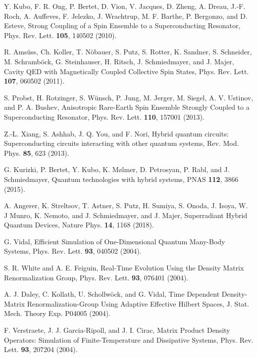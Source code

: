 \documentclass[pra,twocolumn,showpacs,preprintnumbers,amsmath,amssymb,superscriptaddress]{revtex4-1}
\begin{document}
\begin{thebibliography}{99}
 Y. Kubo, F. R. Ong, P. Bertet, D. Vion, V. Jacques, D. Zheng,  A. Dreau, J.-­F. Roch,  A. Auffeves, F. Jelezko, J. Wrachtrup, M. F. Barthe, P. Bergonzo,    and D. Esteve,  Strong Coupling of a Spin Ensemble to a Superconducting Resonator, Phys. Rev. Lett. {\bf 105}, 140502 (2010).


 R. Ams\"uss,    Ch. Koller, T.    N\"obauer,    S. Putz,    S. Rotter,    K. Sandner,    S. Schneider,    M. Schramb\"ock,    G. Steinhauser,    H.    Ritsch,    J. Schmiedmayer, and J. Majer,    Cavity    QED    with    Magnetically    Coupled    Collective    Spin    States,    Phys.    Rev.    Lett.    {\bf 107}, 060502 (2011).

 S. Probst, H. Rotzinger, S. W\"unsch, P. Jung, M. Jerger, M. Siegel,    A.    V. Ustinov,    and    P.    A. Bushev,    Anisotropic    Rare-­Earth Spin Ensemble Strongly Coupled to a Superconducting Resonator, Phys. Rev. Lett. {\bf 110}, 157001 (2013).

 Z.-L. Xiang, S. Ashhab, J. Q. You, and F. Nori, Hybrid quantum circuits: Superconducting circuits interacting with other quantum systems, Rev. Mod. Phys. {\bf 85}, 623  (2013). 

 G. Kurizki, P. Bertet, Y. Kubo, K. M\o lmer, D. Petrosyan, P. Rabl, and J. Schmiedmayer, Quantum technologies with hybrid systems, PNAS {\bf 112}, 3866 (2015).

 A. Angerer, K. Streltsov, T.  Astner, S. Putz, H. Sumiya, S. Onoda, J. Isoya, W. J Munro, K. Nemoto, and J. Schmiedmayer, and J. Majer, Superradiant Hybrid Quantum Devices, Nature Phys. {\bf 14}, 1168 (2018).



     G. Vidal, Efficient Simulation of One-Dimensional Quantum Many-Body Systems, Phys. Rev. Lett. {\bf 93}, 040502 (2004).
    
     S. R. White and A. E. Feiguin, Real-Time Evolution Using the Density Matrix Renormalization Group, Phys. Rev. Lett. {\bf 93}, 076401 (2004).
    
     A. J. Daley, C. Kollath, U. Schollw\"ock, and G. Vidal, Time Dependent Density-Matrix Renormalization-Group Using Adaptive Effective Hilbert Spaces, J. Stat. Mech. Theory Exp. P04005 (2004).
    

 F. Verstraete, J. J. Garcia-Ripoll, and J. I. Cirac, Matrix Product Density Operators: Simulation of Finite-Temperature and Dissipative Systems, Phys. Rev. Lett. {\bf 93}, 207204 (2004). %


\end{thebibliography}
\end{document}
